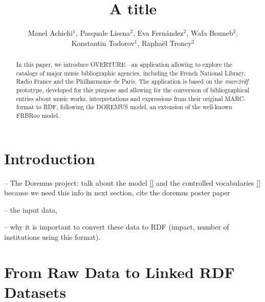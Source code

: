 \documentclass[runningheads,a4paper]{llncs}
\begin{document}
\title{A title}


\author{Manel Achichi$^1$, Pasquale Lisena$^2$, Eva Fern\'{a}ndez$^2$, Wafa Bouneb$^2$, \\ Konstantin Todorov$^1$, Rapha\"{e}l Troncy$^2$}

\maketitle


\begin{abstract}
In this paper, we introduce OVERTURE---an application allowing to explore the catalogs of major music bibliographic agencies, including the French National Library, Radio France and the Philharmonie de Paris. The application is based on the {\it marc2rdf} prototype, developed for this purpose and allowing for the conversion of bibliographical entries about music works, interpretations and expressions from their original MARC-format to RDF, following the DOREMUS model, an extension of the well-known FRBRoo model.
\end{abstract}


\section{Introduction}
\label{sec:introduction}

-- The Doremus project: talk about the model \ref{} and the controlled vocabularies \ref{} because we need this info in next section, cite the doremus poster paper \cite{achichi2015doremus}

-- the input data,

-- why it is important to convert these data to RDF (impact, number of institutions using this format).



\section{From Raw Data to Linked RDF Datasets}
\label{sec:conversion}
\end{document}
